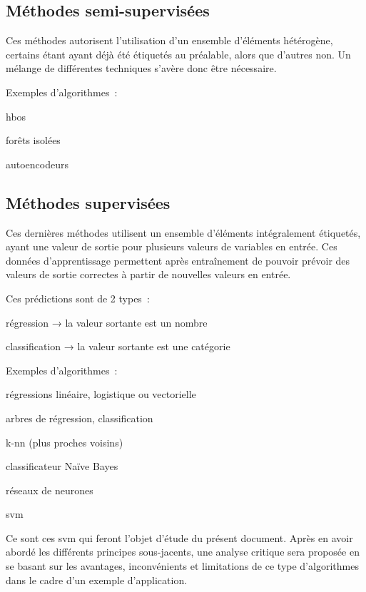 \subsection{Méthodes semi-supervisées}

Ces méthodes autorisent l’utilisation d’un ensemble d’éléments hétérogène,
certains étant ayant déjà été étiquetés au préalable, alors que d’autres non.
Un mélange de différentes techniques s’avère donc être nécessaire.

Exemples d’algorithmes :
\begin{itmz}
\item{\gls{hbos}}
\item{forêts isolées}
\item{autoencodeurs}
\end{itmz}

\subsection{Méthodes supervisées}

Ces dernières méthodes utilisent un ensemble d’éléments intégralement étiquetés,
ayant une valeur de sortie pour plusieurs valeurs de variables en entrée.
Ces données d’apprentissage permettent après entraînement de pouvoir
prévoir des valeurs de sortie correctes à partir de nouvelles valeurs en entrée.

Ces prédictions sont de 2 types :
\begin{itmz}
\item{régression → la valeur sortante est un nombre}
\item{classification → la valeur sortante est une catégorie}
\end{itmz}

Exemples d’algorithmes :
\begin{itmz}
\item{régressions linéaire, logistique ou vectorielle}
\item{arbres de régression, classification}
\item{k-\gls{nn} (plus proches voisins)}
\item{classificateur Naïve Bayes}
\item{réseaux de neurones}
\item{\gls{svm}}
\end{itmz}

Ce sont ces \gls{svm} qui feront l’objet d’étude du présent document.
Après en avoir abordé les différents principes sous-jacents,
une analyse critique sera proposée en se basant sur les avantages,
inconvénients et limitations de ce type d’algorithmes
dans le cadre d’un exemple d’application.

\pagebreak

